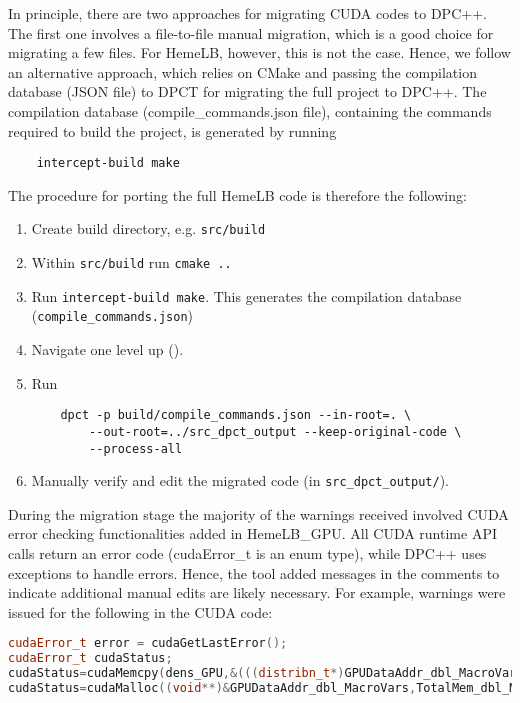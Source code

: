 \documentclass[../main]{subfiles}
\begin{document}
In principle, there are two approaches for migrating CUDA codes to DPC++.
The first one involves a file-to-file manual migration, which is a good choice for migrating a few files.
For HemeLB, however, this is not the case.
Hence, we follow an alternative approach, which relies on CMake and passing the compilation database (JSON file) to DPCT for migrating the full project to DPC++.
The compilation database (compile\_commands.json file), containing the commands required to build the project, is generated by running
\begin{verbatim}
    intercept-build make
\end{verbatim}

The procedure for porting the full HemeLB code is therefore the following:
\begin{enumerate}
	\item Create build directory, e.g. \texttt{src/build}
	\item Within \texttt{src/build} run \texttt{cmake ..} %
	\item Run \texttt{intercept-build make}. This generates the compilation database (\texttt{compile\_commands.json})
	\item Navigate one level up ().
	\item Run
	      \begin{verbatim}
    dpct -p build/compile_commands.json --in-root=. \
        --out-root=../src_dpct_output --keep-original-code \
        --process-all
    \end{verbatim}
	\item Manually verify and edit the migrated code (in \texttt{src\_dpct\_output/}).
\end{enumerate}

During the migration stage the majority of the warnings received involved CUDA error checking functionalities added in HemeLB\_GPU.
All CUDA runtime API calls return an error code (cudaError\_t is an enum type), while DPC++ uses exceptions to handle errors.
Hence, the tool added messages in the comments to indicate additional manual edits are likely necessary.
For example, warnings were issued for the following in the CUDA code:
\begin{lstlisting}[language=C++,basicstyle=\ttfamily\footnotesize]
cudaError_t error = cudaGetLastError();
cudaError_t cudaStatus;
cudaStatus=cudaMemcpy(dens_GPU,&(((distribn_t*)GPUDataAddr_dbl_MacroVars)[0]),MemSz,cudaMemcpyDeviceToHost);
cudaStatus=cudaMalloc((void**)&GPUDataAddr_dbl_MacroVars,TotalMem_dbl_MacroVars);
\end{lstlisting}
\end{document}
